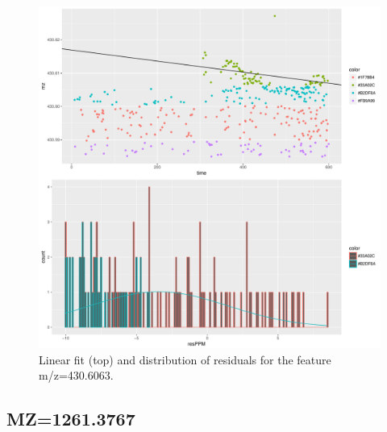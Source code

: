 \documentclass[]{article}
\begin{document}
\begin{figure}[H]
\begin{center}
\includegraphics{Supplementary_document_files/figure-latex/filter.lm.430-1.pdf}
\caption{Linear fit (top) and distribution of residuals for the  feature m/z=430.6063.}
\label{ig:chk.mz.430.6063}
\end{center}
\end{figure}


\subsection{MZ=1261.3767}\label{mz1261.3767}
\end{document}
